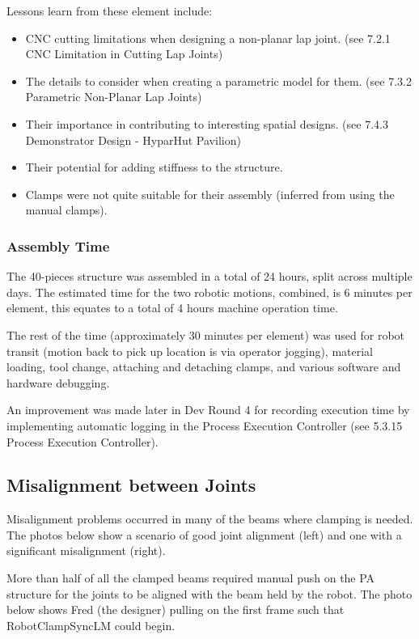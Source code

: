 Lessons learn from these element include:
\begin{itemize}
    \item CNC cutting limitations when designing a non-planar lap joint. (see 7.2.1 CNC Limitation in Cutting Lap Joints)
    \item The details to consider when creating a parametric model for them. (see 7.3.2 Parametric Non-Planar Lap Joints)
    \item Their importance in contributing to interesting spatial designs. (see 7.4.3 Demonstrator Design  - HyparHut Pavilion)
    \item Their potential for adding stiffness to the structure.
    \item Clamps were not quite suitable for their assembly (inferred from using the manual clamps).
\end{itemize}

\subsubsection{Assembly Time}
The 40-pieces structure was assembled in a total of 24 hours, split across multiple days. The estimated time for the two robotic motions, combined, is 6 minutes per element, this equates to a total of 4 hours machine operation time. 

The rest of the time (approximately 30 minutes per element) was used for robot transit (motion back to pick up location is via operator jogging), material loading, tool change, attaching and detaching clamps, and various software and hardware debugging. 

An improvement was made later in Dev Round 4 for recording execution time by implementing automatic logging in the Process Execution Controller (see 5.3.15 Process Execution Controller). 

\subsection{Misalignment between Joints}
Misalignment problems occurred in many of the beams where clamping is needed. The photos below show a scenario of good joint alignment (left) and one with a significant misalignment (right). 

More than half of all the clamped beams required manual push on the PA structure for the joints to be aligned with the beam held by the robot. The photo below shows Fred (the designer) pulling on the first frame such that RobotClampSyncLM could begin.

